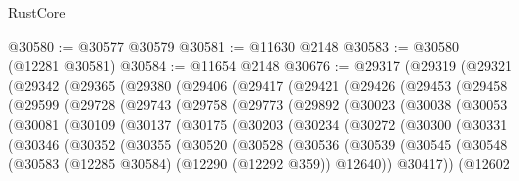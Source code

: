 \begin{lexlean}{RustCore}
\begin{coremodule}
@30580 := @30577 @30579
@30581 := @11630 @2148
@30583 := @30580 (@12281 @30581)
@30584 := @11654 @2148
@30676 := @29317
    (@29319
      (@29321
        (@29342
          (@29365
            (@29380
              (@29406
                (@29417
                  (@29421
                    (@29426
                      (@29453
                        (@29458
                          (@29599
                            (@29728
                              (@29743
                                (@29758
                                  (@29773
                                    (@29892
                                      (@30023
                                        (@30038
                                          (@30053
                                            (@30081
                                              (@30109
                                                (@30137
                                                  (@30175
                                                    (@30203
                                                      (@30234
                                                        (@30272
                                                          (@30300
                                                            (@30331
                                                              (@30346
                                                                (@30352
                                                                  (@30355
                                                                    (@30520
                                                                      (@30528
                                                                        (@30536
                                                                          (@30539
                                                                            (@30545
                                                                              (@30548
                                                                                (@30583
                                                                                  (@12285 @30584)
                                                                                  (@12290
                                                                                    (@12292 @359))
                                                                                  @12640))
                                                                              @30417))
                                                                          (@12602

\end{coremodule}
\end{lexlean}
